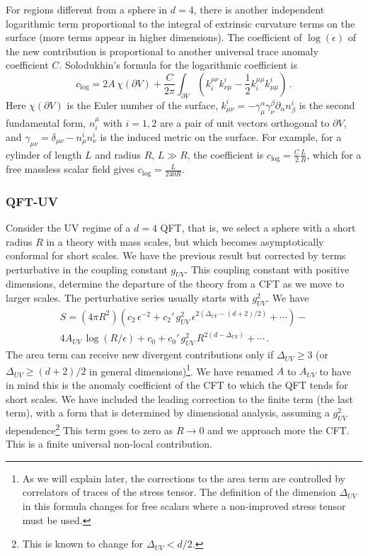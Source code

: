 \documentclass[11pt]{article}
\numberwithin{equation}{section}
\begin{document}
 For regions different from a sphere in $d=4$, there is another independent logarithmic term  proportional to the integral of extrinsic curvature terms on the surface (more terms appear in higher dimensions). The coefficient of $\log(\epsilon)$ of the new contribution is proportional to another universal trace anomaly coefficient $C$. Solodukhin's formula for the logarithmic coefficient is
\begin{equation}
c_{\textrm{log}}=2A \,\chi(\partial V)+\frac{C}{2 \pi}   \int_{\partial V}(k_i^{\mu \nu}k^i_{\nu \mu} -\frac{1}{2} k_i^{\mu \mu}k^i_{\mu \mu})\,.\label{general}
\end{equation}
Here $\chi(\partial V)$ is the Euler number of the surface,  $k^i_{\mu\nu}=-\gamma^\alpha_\mu \gamma^\beta_\nu \partial_\alpha n^i_\beta$ is 
the second fundamental form, $n^\mu_i$ with $i=1,2$ are a pair of unit vectors orthogonal to $\partial V$, and $\gamma_{\mu\nu}=\delta_{\mu\nu}-n^i_\mu n^i_\nu$ is 
the induced metric on the surface. 
For example, for a cylinder of length $L$ and radius $R$, $L\gg R$, the coefficient is $c_{\textrm{log}}=\frac{C}{2}\frac{L}{R}$, which for a free massless scalar field gives $c_{\textrm{log}}=\frac{L}{240 R}$.



\subsubsection*{QFT-UV}
Consider the UV regime of a $d=4$ QFT, that is, we select a sphere with a short radius $R$ in a theory with mass scales, but which becomes asymptotically conformal for short scales.  We have the previous result but corrected by terms perturbative in the coupling constant $g_{UV}$. This coupling constant with positive dimensions, determine the departure of the theory from a CFT as we move to larger scales. The perturbative series usually starts with $g_{UV}^2$. We have 
\begin{multline}
S=(4 \pi R^2)\left(c_2 \,\epsilon^{-2}+ c_{2}'\,g_{UV}^2 \,\epsilon^{2 \left(\Delta_{UV} -(d+2)/2\right)} +\cdots\right)- \\
4 A_{UV} \, \log(R/\epsilon) +c_0 +c_0'\, g_{UV}^2 \, R^{2(d-\Delta_{UV})}+\cdots\,.\label{uvi}
\end{multline}
The area term can receive new divergent contributions only if $\Delta_{UV}\ge 3$ (or $\Delta_{UV}\ge (d+2)/2$ in general dimensions)\footnote{As we will explain later, the corrections to the area term are controlled by correlators of traces of the stress tensor. The definition of the dimension $\Delta_{UV}$ in this formula changes for free scalars where a non-improved stress tensor must be used.}. We have renamed $A$ to $A_{UV}$ to have in mind this is the anomaly coefficient of the CFT to which the QFT tends for short scales. We have included the leading correction to the finite term (the last term), with a form that is determined by dimensional analysis,  assuming a $g_{UV}^2$ dependence\footnote{This is known to change for $\Delta_{UV}<d/2$.} This term goes to zero as $R\rightarrow 0$ and we approach more the CFT. This is a finite universal non-local contribution.  
\end{document}
